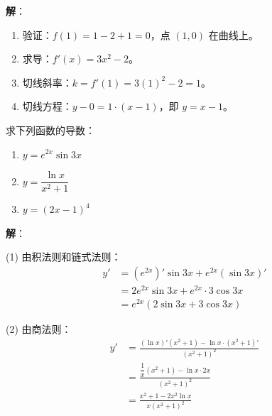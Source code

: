 \documentclass[12pt, a4paper]{ctexart}
\begin{document}
\textbf{解}：
\begin{enumerate}[leftmargin=2em]
  \item 验证：$f(1) = 1 - 2 + 1 = 0$，点 $(1, 0)$ 在曲线上。
  \item 求导：$f'(x) = 3x^2 - 2$。
  \item 切线斜率：$k = f'(1) = 3(1)^2 - 2 = 1$。
  \item 切线方程：$y - 0 = 1 \cdot (x - 1)$，即 $y = x - 1$。
\end{enumerate}

\begin{center}
\end{center}

\begin{examplebox}[【例题3】复合函数求导]
求下列函数的导数：
\begin{enumerate}[leftmargin=2em]
  \item $y = e^{2x} \sin 3x$
  \item $y = \dfrac{\ln x}{x^2 + 1}$
  \item $y = (2x - 1)^4$
\end{enumerate}
\end{examplebox}

\textbf{解}：

(1) 由积法则和链式法则：
\begin{align*}
y' &= (e^{2x})' \sin 3x + e^{2x} (\sin 3x)' \\
&= 2e^{2x} \sin 3x + e^{2x} \cdot 3\cos 3x \\
&= e^{2x}(2\sin 3x + 3\cos 3x)
\end{align*}

(2) 由商法则：
\begin{align*}
y' &= \frac{(\ln x)'(x^2 + 1) - \ln x \cdot (x^2 + 1)'}{(x^2 + 1)^2} \\
&= \frac{\dfrac{1}{x}(x^2 + 1) - \ln x \cdot 2x}{(x^2 + 1)^2} \\
&= \frac{x^2 + 1 - 2x^2 \ln x}{x(x^2 + 1)^2}
\end{align*}
\end{document}
